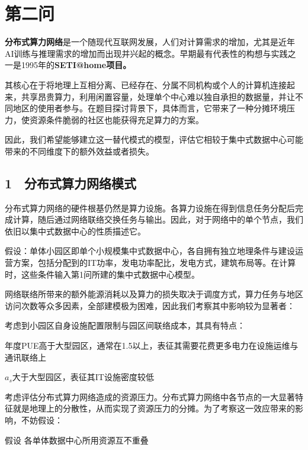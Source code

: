 ﻿%
\section{第二问}

\textbf{分布式算力网络}是一个随现代互联网发展，人们对计算需求的增加，尤其是近年AI训练与推理需求的增加而出现并兴起的概念。早期最有代表性的构想与实践之一是1995年的\textbf{SETI@home项目\cite{q2cref01}。}

其核心在于将地理上互相分离、已经存在、分属不同机构或个人的计算机连接起来，共享昂贵算力，利用闲置容量，处理单个中心难以独自承担的数据量，并让不同地区的使用者参与。在题目探讨背景下，具体而言，它带来了一种分摊环境压力，使资源条件脆弱的社区也能获得充足算力的方案。

因此，我们希望能够建立这一替代模式的模型，评估它相较于集中式数据中心可能带来的不同维度下的额外效益或者损失。

\subsection{1　分布式算力网络模式}

分布式算力网络的硬件根基仍然是算力设施。各算力设施在得到信息任务分配后完成计算，随后通过网络联络交换任务与输出。因此，对于网络中的单个节点，我们依旧以集中式数据中心的性质描述它。

\begin{asum}
假设：单体小园区即单个小规模集中式数据中心，各自拥有独立地理条件与建设运营方案，包括分配到的IT功率，发电功率配比，发电方式，建筑布局等。在计算时，这些条件输入第1问所建的集中式数据中心模型。
\end{asum}

网络联络所带来的额外能源消耗以及算力的损失取决于调度方式，算力任务与地区访问次数等众多因素\cite{q2cref03,q2cref02}，全部建模极为困难，因此我们考察其中影响较为显著者：

考虑到小园区自身设施配置限制与园区间联络成本，其具有特点：

年度PUE高于大型园区，通常在1.5以上，表征其需要花费更多电力在设施运维与通讯联络上

$a_s$大于大型园区，表征其IT设施密度较低

考虑评估分布式算力网络造成的资源压力。分布式算力网络中各节点的一大显著特征就是地理上的分散性，从而实现了资源压力的分摊。为了考察这一效应带来的影响，不妨假设：

\begin{asum}
假设 各单体数据中心所用资源互不重叠
\end{asum}

